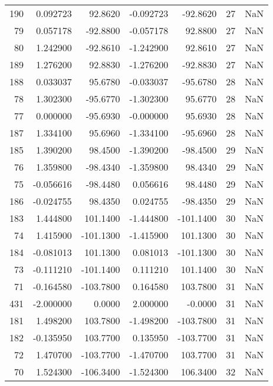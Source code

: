 \begin{tabular}{rrrrrrr}
190 &    0.092723 &   92.8620 &   -0.092723 &    -92.8620 &          27 & NaN \\
 79 &    0.057178 &  -92.8800 &   -0.057178 &     92.8800 &          27 & NaN \\
 80 &    1.242900 &  -92.8610 &   -1.242900 &     92.8610 &          27 & NaN \\
189 &    1.276200 &   92.8830 &   -1.276200 &    -92.8830 &          27 & NaN \\
188 &    0.033037 &   95.6780 &   -0.033037 &    -95.6780 &          28 & NaN \\
 78 &    1.302300 &  -95.6770 &   -1.302300 &     95.6770 &          28 & NaN \\
 77 &    0.000000 &  -95.6930 &   -0.000000 &     95.6930 &          28 & NaN \\
187 &    1.334100 &   95.6960 &   -1.334100 &    -95.6960 &          28 & NaN \\
185 &    1.390200 &   98.4500 &   -1.390200 &    -98.4500 &          29 & NaN \\
 76 &    1.359800 &  -98.4340 &   -1.359800 &     98.4340 &          29 & NaN \\
 75 &   -0.056616 &  -98.4480 &    0.056616 &     98.4480 &          29 & NaN \\
186 &   -0.024755 &   98.4350 &    0.024755 &    -98.4350 &          29 & NaN \\
183 &    1.444800 &  101.1400 &   -1.444800 &   -101.1400 &          30 & NaN \\
 74 &    1.415900 & -101.1300 &   -1.415900 &    101.1300 &          30 & NaN \\
184 &   -0.081013 &  101.1300 &    0.081013 &   -101.1300 &          30 & NaN \\
 73 &   -0.111210 & -101.1400 &    0.111210 &    101.1400 &          30 & NaN \\
 71 &   -0.164580 & -103.7800 &    0.164580 &    103.7800 &          31 & NaN \\
431 &   -2.000000 &    0.0000 &    2.000000 &     -0.0000 &          31 & NaN \\
181 &    1.498200 &  103.7800 &   -1.498200 &   -103.7800 &          31 & NaN \\
182 &   -0.135950 &  103.7700 &    0.135950 &   -103.7700 &          31 & NaN \\
 72 &    1.470700 & -103.7700 &   -1.470700 &    103.7700 &          31 & NaN \\
 70 &    1.524300 & -106.3400 &   -1.524300 &    106.3400 &          32 & NaN \\

\end{tabular}
